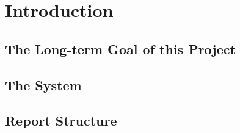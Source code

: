 \section{Introduction}

\subsection{The Long-term Goal of this Project}

\subsection{The System}

\subsection{Report Structure}